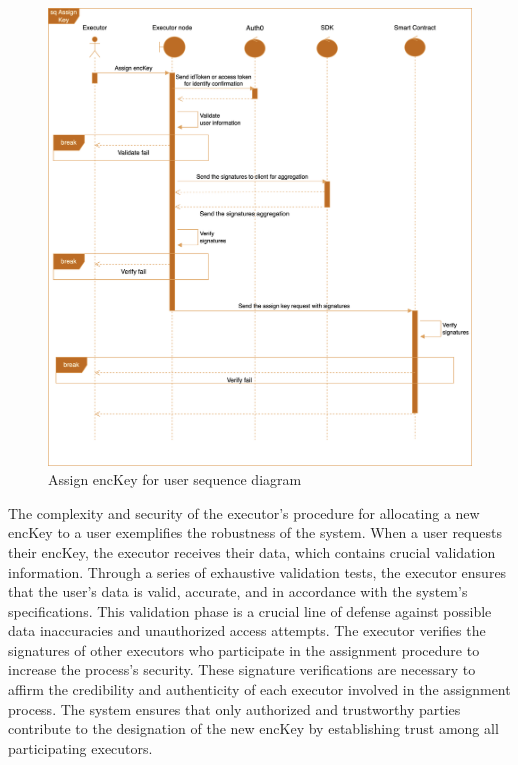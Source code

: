 \documentclass[../Main.tex]{subfiles}
\begin{document}
\begin{figure}[H]
 \centering
 \includegraphics[scale=0.14]{Figure/assign-key-sequence-diagram.png}
 \caption{Assign encKey for user sequence diagram}
    \label{fig:assign-key-sequence-diagram}
\end{figure}
The complexity and security of the executor's procedure for allocating a new encKey to a user exemplifies the robustness of the system. When a user requests their encKey, the executor receives their data, which contains crucial validation information. Through a series of exhaustive validation tests, the executor ensures that the user's data is valid, accurate, and in accordance with the system's specifications. This validation phase is a crucial line of defense against possible data inaccuracies and unauthorized access attempts. The executor verifies the signatures of other executors who participate in the assignment procedure to increase the process's security. These signature verifications are necessary to affirm the credibility and authenticity of each executor involved in the assignment process. The system ensures that only authorized and trustworthy parties contribute to the designation of the new encKey by establishing trust among all participating executors.
\end{document}
